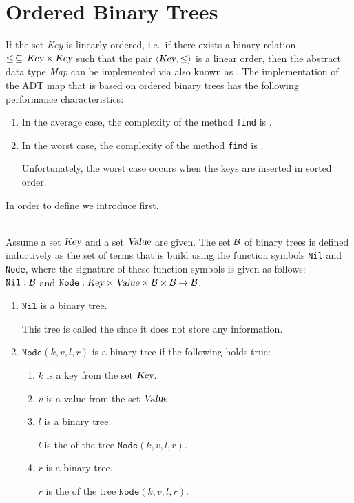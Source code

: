 \section{Ordered Binary Trees}
If the set \textsl{Key} is linearly ordered, i.e.~if there exists a binary relation
$\leq \,\subseteq\,\textsl{Key}\times\textsl{Key}$ such that the pair $\langle \textsl{Key}, \leq \rangle$ is a linear
order, then the abstract data type \textsl{Map} can be implemented via  
\href{https://en.wikipedia.org/wiki/Binary_search_tree}{} also known as
. 
The implementation of the ADT map that is based on ordered binary trees has the following performance
characteristics: 
\begin{enumerate}
\item In the average case, the complexity of the method \texttt{find} is .
\item In the worst case, the complexity of the method \texttt{find} is .

      Unfortunately, the worst case occurs when the keys are inserted in sorted order.
\end{enumerate}
In order to define  we introduce  first.

\begin{Definition} \hspace*{\fill} \\
  Assume a set $\textsl{Key}$ and a set $\textsl{Value}$ are given.
  The set $\mathcal{B}$ of binary trees is defined inductively as the set of terms that is build using the
  function symbols \texttt{Nil} and \texttt{Node}, where the signature of these function symbols is
  given as follows: \\[0.2cm]
  \hspace*{1.3cm} 
  $\texttt{Nil}: \mathcal{B}$ \qquad and \qquad  $\texttt{Node}: \textsl{Key} \times \textsl{Value} \times \mathcal{B} \times \mathcal{B} \rightarrow \mathcal{B}$.
  \begin{enumerate}
  \item $\texttt{Nil}$ is a binary tree.

        This tree is called the  since it does not store any information.
  \item $\texttt{Node}(k, v, l, r)$ is a binary tree if the following holds true: 
        \begin{enumerate}
        \item $k$ is a key from the set $\textsl{Key}$.
        \item $v$ is a value from the set $\textsl{Value}$.
        \item $l$ is a binary tree.

              $l$ is the   of the tree $\texttt{Node}(k, v, l, r)$.
        \item $r$ is a binary tree.

              $r$ is the  of the tree $\texttt{Node}(k, v, l, r)$.
              \eox
        \end{enumerate}
  \end{enumerate}
\end{Definition}

